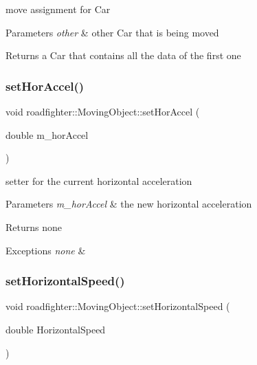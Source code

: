 move assignment for Car 
\begin{DoxyParams}{Parameters}
{\em other} & other Car that is being moved \\
\hline
\end{DoxyParams}
\begin{DoxyReturn}{Returns}
a Car that contains all the data of the first one 
\end{DoxyReturn}
\mbox{\label{classroadfighter_1_1MovingObject_a47bcc94c24b3b6b047ecf45c22574d09}} 
\subsubsection{\texorpdfstring{set\+Hor\+Accel()}{setHorAccel()}}
{\footnotesize\ttfamily void roadfighter\+::\+Moving\+Object\+::set\+Hor\+Accel (\begin{DoxyParamCaption}\item[{double}]{m\+\_\+hor\+Accel }\end{DoxyParamCaption})}

setter for the current horizontal acceleration 
\begin{DoxyParams}{Parameters}
{\em m\+\_\+hor\+Accel} & the new horizontal acceleration \\
\hline
\end{DoxyParams}
\begin{DoxyReturn}{Returns}
none 
\end{DoxyReturn}

\begin{DoxyExceptions}{Exceptions}
{\em none} & \\
\hline
\end{DoxyExceptions}
\mbox{\label{classroadfighter_1_1MovingObject_a20321fab6dfee452486f80d744d7002d}} 
\subsubsection{\texorpdfstring{set\+Horizontal\+Speed()}{setHorizontalSpeed()}}
{\footnotesize\ttfamily void roadfighter\+::\+Moving\+Object\+::set\+Horizontal\+Speed (\begin{DoxyParamCaption}\item[{double}]{Horizontal\+Speed }\end{DoxyParamCaption})}

